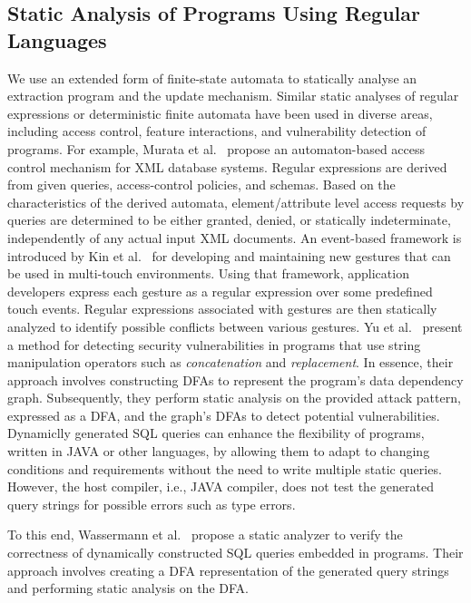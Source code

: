\subsection{Static Analysis of Programs Using Regular Languages}
 We use an extended form of finite-state automata to statically analyse an extraction program and the update mechanism. Similar static analyses of regular expressions or deterministic finite automata   have been used in diverse areas, including  access control, feature interactions, and vulnerability detection of programs. For example, Murata et al.~\cite{DBLP:journals/tissec/MurataTKH06} propose an automaton-based access control mechanism for XML database systems. Regular expressions are derived  from given queries, access-control policies, and  schemas. Based on the characteristics of the derived automata, element/attribute level access requests  by  queries are determined to be either  granted, denied, or statically indeterminate, independently of any actual input XML documents. An event-based framework is introduced by Kin et al.~\cite{DBLP:conf/chi/KinHDA12} for developing and maintaining new gestures that can be used in multi-touch environments. Using that framework, application developers express each gesture as a regular expression over some predefined touch events. Regular expressions associated with  gestures are then statically analyzed to identify possible conflicts between various gestures. Yu et al.~\cite{DBLP:journals/fmsd/YuABI14} present a method for detecting security vulnerabilities in programs that use string manipulation operators such as \emph{concatenation} and \emph{replacement}. In essence, their approach involves constructing DFAs to represent the program's data dependency graph. Subsequently, they perform static analysis on the provided attack pattern, expressed as a DFA, and the graph's DFAs to detect potential vulnerabilities.
 Dynamiclly generated SQL queries can enhance the flexibility of programs, written in  JAVA or other languages,  by allowing them to adapt to changing conditions and requirements without the need to write multiple static queries. However, the host compiler, i.e., JAVA compiler,  does not test the generated query strings for possible errors such as type errors.

 To this end, Wassermann et al.~\cite{DBLP:journals/tosem/WassermannGSD07} propose a static analyzer to verify the correctness of dynamically constructed SQL queries embedded in programs. Their approach involves creating a DFA representation of the generated query strings and   performing static analysis on the  DFA.